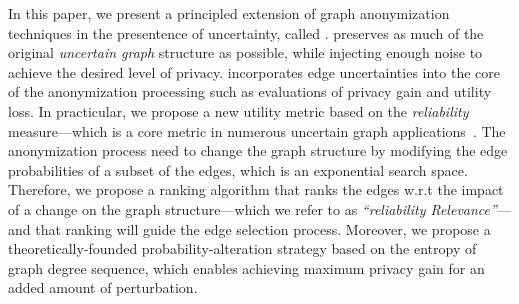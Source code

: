 
\vspace{2mm}
In this paper, we present a principled extension of graph anonymization techniques in the presentence of uncertainty, called \SysNameNS.
\SysName preserves as much of the original \emph{uncertain graph} structure as possible, while injecting enough noise to achieve the desired level of privacy.  
\SysName incorporates edge uncertainties into the core of the  anonymization processing such as evaluations of privacy gain and utility loss. 
In practicular, we propose a new utility metric based on the {\em reliability} measure---which is a core metric in numerous uncertain graph applications~\cite{Asthana_Predicting_2004,Zhao_Detecting_2014,Ghosh_On_2007}. 
The anonymization process need to change the graph structure by modifying the edge probabilities of a subset of the edges, which is an exponential search space. 
Therefore, we propose a ranking algorithm that ranks the edges w.r.t the impact of a change on the graph structure---which we refer to as {\em ``reliability Relevance''}---and 
that ranking will guide the edge selection process. 
Moreover, we propose a theoretically-founded probability-alteration strategy based on the entropy of graph degree sequence, which enables achieving maximum privacy gain for an added amount of 
perturbation. 






